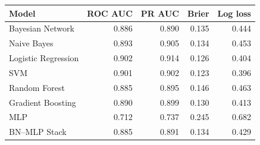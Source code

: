 \begin{tabular}{lrrrr}
\toprule
Model & ROC AUC & PR AUC & Brier & Log loss \\
\midrule
Bayesian Network & 0.886 & 0.890 & 0.135 & 0.444 \\
Naive Bayes & 0.893 & 0.905 & 0.134 & 0.453 \\
Logistic Regression & 0.902 & 0.914 & 0.126 & 0.404 \\
SVM & 0.901 & 0.902 & 0.123 & 0.396 \\
Random Forest & 0.885 & 0.895 & 0.146 & 0.463 \\
Gradient Boosting & 0.890 & 0.899 & 0.130 & 0.413 \\
MLP & 0.712 & 0.737 & 0.245 & 0.682 \\
BN--MLP Stack & 0.885 & 0.891 & 0.134 & 0.429 \\
\bottomrule
\end{tabular}
